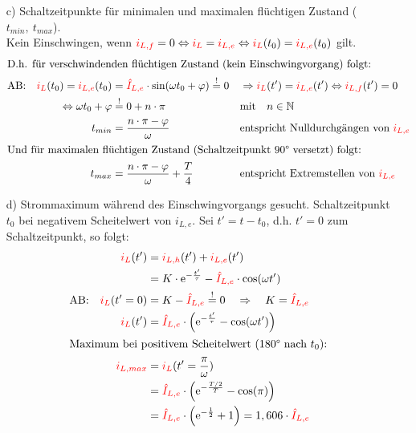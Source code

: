 {\begin{itemize}
\begin{align*}
        &= L \cdot \left( \frac{R_1}{R_2} + 1 \right) \cdot \dt\, \eci{i_L} + R_1 \cdot \eci{i_L} \qquad \bigg| \cdot \frac{1}{R_1}\\
        \frac{\ecv{u_1}}{R_1} &= \underbrace{L \cdot \left( \frac{1}{R_1} + \frac{1}{R_2} \right)}_{\ =\tau} \cdot \dt\, \eci{i_L} + \eci{i_L}\\ 
        \tau &= L \cdot \left( \frac{1}{R_1} + \frac{1}{R_2} \right) = \frac{L}{R_1||R_2}
    \end{align*}
    \item[c)] Schaltzeitpunkte für minimalen und maximalen flüchtigen Zustand ($t_{min},\ t_{max}$). \\ 
    Kein Einschwingen, wenn 
    ${\color{red}i_{L,f}}=0 \Leftrightarrow {\color{red}i_L}={\color{red}i_{L,e}} \Leftrightarrow {\color{red}i_L}(t_0)={\color{red}i_{L,e}}(t_0)$ gilt.
    \begin{align*}
        \intertext{D.h. für verschwindenden flüchtigen Zustand (kein Einschwingvorgang) folgt:}
        &\text{AB:}&{\color{red}i_L}(t_0) = {\color{red}i_{L,e}}(t_0) &= {\color{red}\hat{I}_{L,e}} \cdot \sin(\omega t_0 + \varphi) \overset{!}= 0 &
            &\Rightarrow {\color{red}i_L}(t')={\color{red}i_{L,e}}(t') \Leftrightarrow {\color{red}i_{L,f}}(t')=0\\
        &&\Leftrightarrow \omega t_0 + \varphi &\overset{!}{=} 0 + n\cdot \pi &
            &\text{mit} \quad n \in \mathbb{N} \\
        &&t_{min} &= \frac{n\cdot \pi - \varphi}{\omega} &
            &\text{entspricht Nulldurchgängen von ${\color{red}i_{L,e}}$}\\
        \intertext{Und für maximalen flüchtigen Zustand (Schaltzeitpunkt $90\degree$ versetzt) folgt:}
        &&t_{max} &= \frac{n\cdot \pi - \varphi}{\omega} + \frac{T}{4} &
            &\text{entspricht Extremstellen von ${\color{red}i_{L,e}}$}
    \end{align*}
    \item[d)] Strommaximum während des Einschwingvorgangs gesucht. 
    Schaltzeitpunkt $t_0$ bei negativem Scheitelwert von $i_{L,e}$. 
    Sei $t' = t - t_0$, d.h. $t'=0$ zum Schaltzeitpunkt, so folgt:
    \begin{align*}
        {\color{red}i_L}(t') &= {\color{red}i_{L,h}}(t') + {\color{red}i_{L,e}}(t') \\
        &= K \cdot \mathrm{e}^{-\frac{t'}{\tau}} - {\color{red}\hat{I}_{L,e}} \cdot \cos(\omega t')\\
        \text{AB:}\quad {\color{red}i_L}(t'=0) &= K - {\color{red}\hat{I}_{L,e}}  \overset{!}{=}0 \quad \Rightarrow \quad K = {\color{red}\hat{I}_{L,e}}\\
        {\color{red}i_L}(t') &= {\color{red}\hat{I}_{L,e}} \cdot \left( \mathrm{e}^{-\frac{t'}{\tau}} - \cos(\omega t') \right) \\
        \intertext{Maximum bei positivem Scheitelwert ($180\degree$ nach $t_0$):}
        {\color{red}i_{L,max}} &= {\color{red}i_L}(t' = \frac{\pi}{\omega}) \\
        &= {\color{red}\hat{I}_{L,e}} \cdot \left( \mathrm{e}^{-\frac{T/2}{T}} - \cos(\pi) \right) \\
        &= {\color{red}\hat{I}_{L,e}} \cdot \left( \mathrm{e}^{-\frac{1}{2}} + 1\right) = 1,606 \cdot {\color{red}\hat{I}_{L,e}}
    \end{align*}
    \end{itemize}
}